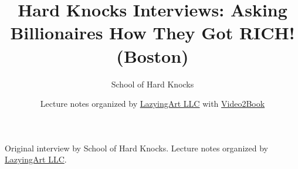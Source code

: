 \documentclass[11pt,oneside]{book}
\begin{document}
\frontmatter
\title{Hard Knocks Interviews: Asking Billionaires How They Got RICH! (Boston)}
\author{School of Hard Knocks}
\date{Lecture notes organized by \href{https://lazying.art}{LazyingArt LLC} with \href{https://github.com/lachlanchen/Video2Book}{Video2Book}}
\maketitle
\begin{center}
\small Original interview by School of Hard Knocks. Lecture notes organized by \href{https://lazying.art}{LazyingArt LLC}.
\end{center}
\clearpage
\mainmatter

\end{document}
